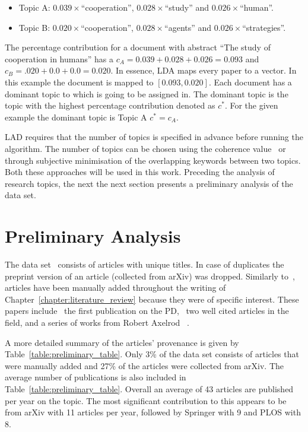 \begin{itemize}
    \item Topic A: \(0.039 \times\)``cooperation'', \(0.028 \times\)``study'' and \(0.026 \times\)``human''.
    \item Topic B: \(0.020 \times\)``cooperation'', \(0.028 \times\)``agents'' and
    \(0.026 \times\)``strategies''.
\end{itemize}

The percentage contribution for a document with abstract ``The study of
cooperation in humans'' has a \(c_{A} = 0.039 + 0.028 + 0.026 = 0.093\) and
\(c_B = .020 + 0.0 + 0.0 = 0.020\). In essence, LDA maps every paper to a
vector. In this example the document is mapped to \([0.093, 0.020]\). Each
document has a dominant topic to which is going to be assigned in. The dominant
topic is the topic with the highest percentage contribution denoted as \(c^*\).
For the given example the dominant topic is Topic A \(c^*=c_A\).

LAD requires that the number of topics is specified in advance before running
the algorithm. The number of topics can be chosen using the coherence
value~\cite{Roder2015} or through subjective minimisation of the overlapping
keywords between two topics. Both these approaches will be used in this work.
Preceding the analysis of research topics, the next the next section presents a
preliminary analysis of the data set.

\section{Preliminary Analysis}\label{section:preliminary}

The data set~\cite{pd_data_2018} consists of \totalarticles articles with unique
titles. In case of duplicates the preprint version of an article (collected from
arXiv) was dropped. Similarly to~\cite{Liu2015}, \manual articles have been manually
added throughout the writing of Chapter~\ref{chapter:literature_review} because
they were of specific interest. These papers include~\cite{Flood1958} the first
publication on the PD,~\cite{Ohtsuki2006, Stewart2012} two well cited
articles in the field, and a series of works from Robert Axelrod
~\cite{Axelrod1980a, Axelrod1980b, Axelrod1987, Axelrod1981, Riolo2001}.

A more detailed summary of the articles' provenance
is given by Table~\ref{table:preliminary_table}. Only 3\% of the data set consists of
articles that were manually added and 27\% of the articles were collected from
arXiv. The average number of publications is also included in
Table~\ref{table:preliminary_table}. Overall an average of 43 articles are published
per year on the topic. The most significant contribution to this appears to be
from arXiv with 11 articles per year, followed by Springer with 9 and PLOS with
8.

